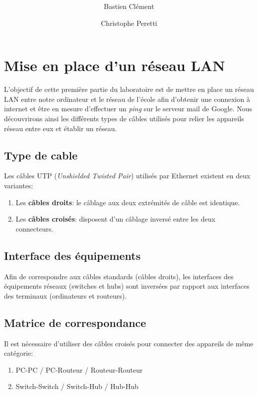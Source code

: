 \documentclass[11pt,a4paper]{article}
\author{Bastien Clément \and Christophe Peretti}
\title{{\normalsize \doccourse} \\ \doctitle }
\begin{document}
\maketitle
\vspace{1em}

\section{Mise en place d'un réseau LAN}

L'objectif de cette première partie du laboratoire est de mettre en place un réseau LAN entre notre ordinateur et le réseau de l'école afin d'obtenir une connexion à internet et être en mesure d'effectuer un \textit{ping} sur le serveur mail de Google. Nous découvrirons ainsi les différents types de câbles utilisés pour relier les appareils réseau entre eux et établir un réseau.

\subsection{Type de cable}

Les câbles UTP (\textit{Unshielded Twisted Pair}) utilisés par Ethernet existent en deux variantes:

\begin{enumerate}
	\item Les \textbf{câbles droits}: le câblage aux deux extrémités de câble est identique.
	\item Les \textbf{câbles croisés}: disposent d'un câblage inversé entre les deux connecteurs.
\end{enumerate}

\subsection{Interface des équipements}

Afin de correspondre aux câbles standards (câbles droits), les interfaces des équipements réseaux (switches et hubs) sont inversées par rapport aux interfaces des terminaux (ordinateurs et routeurs).

\subsection{Matrice de correspondance}

Il est nécessaire d'utiliser des câbles croisés pour connecter des appareils de même catégorie:

\begin{enumerate}
	\item PC-PC / PC-Routeur / Routeur-Routeur
	\item Switch-Switch / Switch-Hub / Hub-Hub
\end{enumerate}
\end{document}
